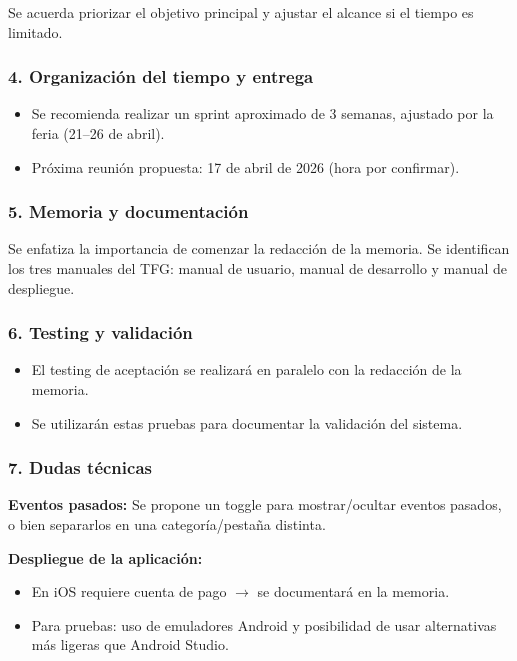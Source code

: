 Se acuerda priorizar el objetivo principal y ajustar el alcance si el tiempo es limitado.

\subsubsection*{4. Organización del tiempo y entrega}
\begin{itemize}
    \item Se recomienda realizar un sprint aproximado de 3 semanas, ajustado por la feria (21--26 de abril).
    \item Próxima reunión propuesta: 17 de abril de 2026 (hora por confirmar).
\end{itemize}

\subsubsection*{5. Memoria y documentación}
Se enfatiza la importancia de comenzar la redacción de la memoria. Se identifican los tres manuales del TFG: manual de usuario, manual de desarrollo y manual de despliegue.

\subsubsection*{6. Testing y validación}
\begin{itemize}
    \item El testing de aceptación se realizará en paralelo con la redacción de la memoria.
    \item Se utilizarán estas pruebas para documentar la validación del sistema.
\end{itemize}

\subsubsection*{7. Dudas técnicas}

\textbf{Eventos pasados:} Se propone un toggle para mostrar/ocultar eventos pasados, o bien separarlos en una categoría/pestaña distinta.

\textbf{Despliegue de la aplicación:}
\begin{itemize}
    \item En iOS requiere cuenta de pago $\rightarrow$ se documentará en la memoria.
    \item Para pruebas: uso de emuladores Android y posibilidad de usar alternativas más ligeras que Android Studio.
\end{itemize}

